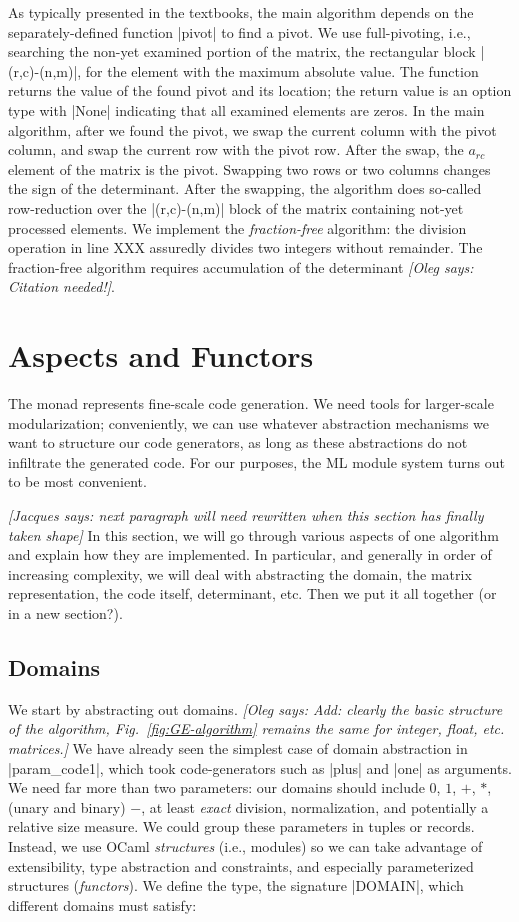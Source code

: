 \documentclass{elsart}
\newcommand{\oleg}[1]{{\it [Oleg says: #1]}}
\newcommand{\jacques}[1]{{\it [Jacques says: #1]}}
\begin{document}
As typically presented in the textbooks, the main algorithm depends on
the separately-defined function |pivot| to find a pivot. We use
full-pivoting, i.e., searching the non-yet examined portion of the matrix, 
the rectangular block |(r,c)-(n,m)|, for the element with the 
maximum absolute value. The function returns the value of the
found pivot and its location; the return value is an option type with
|None| indicating that all examined elements are zeros. In the main
algorithm, after we found the pivot, we swap the current column 
with the pivot column, and swap the current row with the pivot row. 
After the swap, the $a_{rc}$ element of the matrix is the pivot.
Swapping two rows or two columns changes the sign of the determinant.
After the swapping, the algorithm does so-called row-reduction
over the |(r,c)-(n,m)| block of the matrix containing not-yet
processed elements. We implement the \emph{fraction-free} algorithm:
the division operation in line XXX assuredly divides two integers
without remainder. The fraction-free algorithm requires accumulation
of the determinant \oleg{Citation needed!}.

\section{Aspects and Functors}\label{functors}

The monad represents fine-scale code generation. We need tools for
larger-scale modularization; conveniently, we can use whatever abstraction
mechanisms we want to structure our code generators, as long as these
abstractions do not infiltrate the generated code. For our purposes, the
ML module system turns out to be most convenient.

\jacques{next paragraph will need rewritten when this section has
finally taken shape}
In this section, we will go through various aspects of one algorithm
and explain how they are implemented.  In particular, and generally in
order of increasing complexity, we will deal with abstracting the
domain, the matrix representation, the code itself, determinant, etc.
Then we put it all together (or in a new section?).

\subsection{Domains}\label{sec:domains}

We start by abstracting out domains. \oleg{Add: clearly the basic
  structure of the algorithm, Fig.~\ref{fig:GE-algorithm} remains the
  same for integer, float, etc. matrices.} We have already seen the
simplest case of domain abstraction in |param_code1|, which took
code-generators such as |plus| and |one| as arguments.  We need far
more than two parameters: our domains should include $0$, $1$, $+$,
$*$, (unary and binary) $-$, at least \emph{exact} division,
normalization, and potentially a relative size measure. We could group
these parameters in tuples or records.  Instead, we use OCaml
\emph{structures} (i.e., modules) so we can take advantage of
extensibility, type abstraction and constraints, and especially
parameterized structures (\emph{functors}).  We define the type, the
signature |DOMAIN|, which different domains must satisfy:
\end{document}
